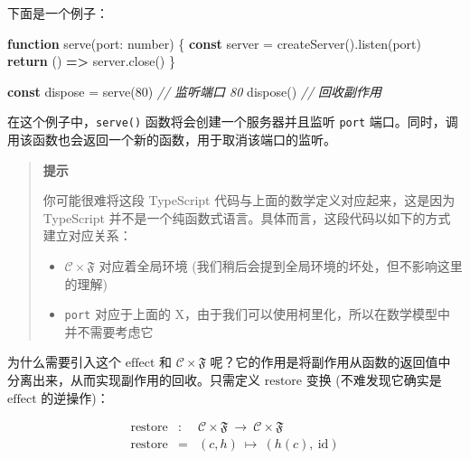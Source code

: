 \documentclass[
  chinese,
  11pt,
]{article}
\newenvironment{Shaded}{}{}
\newcommand{\CommentTok}[1]{\textcolor[rgb]{0.38,0.63,0.69}{\textit{#1}}}
\newcommand{\ControlFlowTok}[1]{\textcolor[rgb]{0.00,0.44,0.13}{\textbf{#1}}}
\newcommand{\DataTypeTok}[1]{\textcolor[rgb]{0.56,0.13,0.00}{#1}}
\newcommand{\DecValTok}[1]{\textcolor[rgb]{0.25,0.63,0.44}{#1}}
\newcommand{\FunctionTok}[1]{\textcolor[rgb]{0.02,0.16,0.49}{#1}}
\newcommand{\KeywordTok}[1]{\textcolor[rgb]{0.00,0.44,0.13}{\textbf{#1}}}
\newcommand{\NormalTok}[1]{#1}
\newcommand{\OperatorTok}[1]{\textcolor[rgb]{0.40,0.40,0.40}{#1}}
\providecommand{\tightlist}{%
  \setlength{\itemsep}{0pt}\setlength{\parskip}{0pt}}
\begin{document}
下面是一个例子：

\begin{Shaded}
\begin{Highlighting}[]
\KeywordTok{function} \FunctionTok{serve}\NormalTok{(port}\OperatorTok{:} \DataTypeTok{number}\NormalTok{) \{}
  \KeywordTok{const}\NormalTok{ server }\OperatorTok{=} \FunctionTok{createServer}\NormalTok{()}\OperatorTok{.}\FunctionTok{listen}\NormalTok{(port)}
  \ControlFlowTok{return}\NormalTok{ () }\KeywordTok{=\textgreater{}}\NormalTok{ server}\OperatorTok{.}\FunctionTok{close}\NormalTok{()}
\NormalTok{\}}

\KeywordTok{const}\NormalTok{ dispose }\OperatorTok{=} \FunctionTok{serve}\NormalTok{(}\DecValTok{80}\NormalTok{)       }\CommentTok{// 监听端口 80}
\FunctionTok{dispose}\NormalTok{()                       }\CommentTok{// 回收副作用}
\end{Highlighting}
\end{Shaded}

在这个例子中，\texttt{serve()} 函数将会创建一个服务器并且监听
\texttt{port}
端口。同时，调用该函数也会返回一个新的函数，用于取消该端口的监听。

\begin{quote}
\textbf{提示}

你可能很难将这段 TypeScript 代码与上面的数学定义对应起来，这是因为
TypeScript
并不是一个纯函数式语言。具体而言，这段代码以如下的方式建立对应关系：

\begin{itemize}
\tightlist
\item
  \(\mathcal{C}\times\mathfrak{F}\) 对应着全局环境
  (我们稍后会提到全局环境的坏处，但不影响这里的理解)
\item
  \texttt{port} 对应于上面的
  \(\text{X}\)，由于我们可以使用柯里化，所以在数学模型中并不需要考虑它
\end{itemize}
\end{quote}

为什么需要引入这个 \(\text{effect}\) 和
\(\mathcal{C}\times\mathfrak{F}\)
呢？它的作用是将副作用从函数的返回值中分离出来，从而实现副作用的回收。只需定义
\(\text{restore}\) 变换 (不难发现它确实是 \(\text{effect}\) 的逆操作)：

\[
\begin{array}{rcl}
\text{restore}&:&\mathcal{C}\times\mathfrak{F}\ \to\ \mathcal{C}\times\mathfrak{F}\\
\text{restore}&=&\left(c,h\right)\ \mapsto\ \left(h(c),\ \text{id}\right)
\end{array}
\]
\end{document}
